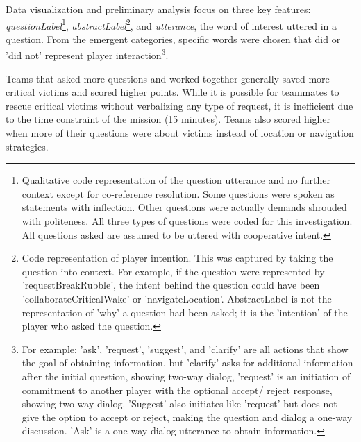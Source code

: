 Data visualization and preliminary analysis focus on three
key features: \textit{questionLabel}\footnote{Qualitative code representation of the
question utterance and no further context except for co-reference resolution.
Some questions were spoken as statements with inflection. Other questions were
actually demands shrouded with politeness. All three types of questions were
coded for this investigation. All questions asked are assumed to be uttered
with cooperative intent.}, \textit{abstractLabel}\footnote{Code representation of
player intention. This was captured by taking the question into context. For
example, if the question were represented by 'requestBreakRubble', the intent
behind the question could have been 'collaborateCriticalWake' or
'navigateLocation'. AbstractLabel is not the representation of 'why' a
question had been asked; it is the 'intention' of the player who asked the
question.}, and \textit{utterance}, the word of interest uttered in a question. From
the emergent categories, specific words were chosen that did or 'did not'
represent player interaction\footnote{For example: 'ask', 'request',
'suggest', and 'clarify' are all actions that show the goal of
obtaining information, but 'clarify' asks for additional information after the
initial question, showing two-way dialog, 'request' is an initiation of
commitment to another player with the optional accept/ reject response, showing
two-way dialog. 'Suggest' also initiates like 'request' but does not give the
option to accept or reject, making the question and dialog a one-way
discussion. 'Ask' is a one-way dialog utterance to obtain information.}.



Teams that asked more questions and worked together generally saved more
critical victims and scored higher points. While it is possible for teammates
to rescue critical victims without verbalizing any type of request, it is
inefficient due to the time constraint of the mission (15 minutes). Teams also
scored higher when more of their questions were about victims instead of
location or navigation strategies.

